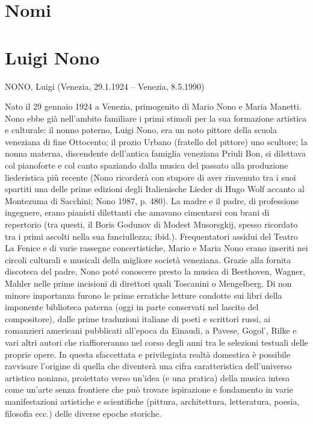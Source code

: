 \section{Nomi}

\section{Luigi Nono}

NONO, Luigi (Venezia, 29.1.1924 – Venezia, 8.5.1990)

Nato il 29 gennaio 1924 a Venezia, primogenito di Mario Nono e Maria Manetti. Nono ebbe già nell’ambito familiare i primi stimoli per la sua formazione artistica e culturale: il nonno paterno, Luigi Nono, era un noto pittore della scuola veneziana di fine Ottocento; il prozio Urbano (fratello del pittore) uno scultore; la nonna materna, discendente dell’antica famiglia veneziana Priuli Bon, si dilettava col pianoforte e col canto spaziando dalla musica del passato alla produzione liederistica più recente (Nono ricorderà con stupore di aver rinvenuto tra i suoi spartiti una delle prime edizioni degli Italienische Lieder di Hugo Wolf accanto al Montezuma di Sacchini; Nono 1987, p. 480). La madre e il padre, di professione ingegnere, erano pianisti dilettanti che amavano cimentarsi con brani di repertorio (tra questi, il Boris Godunov di Modest Musorsgkij, spesso ricordato tra i primi ascolti nella sua fanciullezza; ibid.). Frequentatori assidui del Teatro La Fenice e di varie rassegne concertistiche, Mario e Maria Nono erano inseriti nei circoli culturali e musicali della migliore società veneziana. Grazie alla fornita discoteca del padre, Nono poté conoscere presto la musica di Beethoven, Wagner, Mahler nelle prime incisioni di direttori quali Toscanini o Mengelberg. Di non minore importanza furono le prime erratiche letture condotte sui libri della imponente biblioteca paterna (oggi in parte conservati nel lascito del compositore), dalle prime traduzioni italiane di poeti e scrittori russi, ai romanzieri americani pubblicati all’epoca da Einaudi, a Pavese, Gogol’, Rilke e vari altri autori che riaffioreranno nel corso degli anni tra le selezioni testuali delle proprie opere. In questa sfaccettata e privilegiata realtà domestica è possibile ravvisare l’origine di quella che diventerà una cifra caratteristica dell’universo artistico noniano, proiettato verso un’idea (e una pratica) della musica intesa come un’arte senza frontiere che può trovare ispirazione e fondamento in varie manifestazioni artistiche e scientifiche (pittura, architettura, letteratura, poesia, filosofia ecc.) delle diverse epoche storiche.

